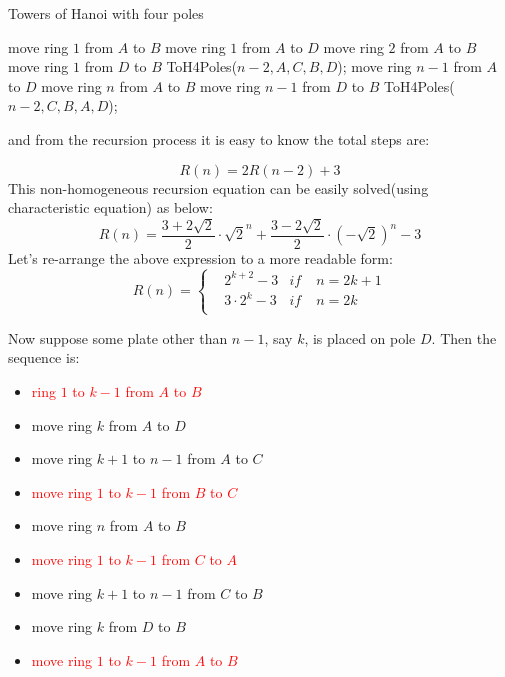 \documentclass[a4paper,11pt]{article}
\theoremstyle{mytheor}
\begin{document}
\begin{algorithm}[H]
\caption{Towers of Hanoi with four poles}\label{fourpoles}
\begin{algorithmic}[1]
    \State move ring $1$ from $A$ to $B$
    \State move ring $1$ from $A$ to $D$
    \State move ring $2$ from $A$ to $B$
    \State move ring $1$ from $D$ to $B$
  \Else
    \State ToH4Poles($n-2, A, C, B, D$);
    \State move ring $n-1$ from $A$ to $D$
    \State move ring $n$ from $A$ to $B$
    \State move ring $n-1$ from $D$ to $B$
    \State ToH4Poles($n-2, C, B, A, D$);
  \EndIf
\EndProcedure
\end{algorithmic}
\end{algorithm}

\noindent and from the recursion process it is easy to know the total steps are:

$$
R(n) = 2R(n-2) + 3
$$
This non-homogeneous recursion equation can be easily solved(using characteristic equation) as below:
$$
R(n) = \frac{3+2\sqrt{2}}{2}\cdot \sqrt{2}^{n}+\frac{3-2\sqrt{2}}{2}\cdot (-\sqrt{2})^{n}-3
$$
Let's re-arrange the above expression to a more readable form:
$$R(n)=\left\{
\begin{aligned}
&2^{k+2}-3 & if\; &n=2k+1 \\
&3\cdot 2^{k} - 3  & if\; &  n =2k \\
\end{aligned}
\right.
$$


\vspace{1 ex}
\noindent Now suppose some plate other than $n-1$, say $k$, is placed on pole $D$. 
Then the sequence is:
\begin{itemize}
    \item \textcolor{red}{ring $1$ to $k-1$ from $A$ to $B$}
    \item move ring $k$ from $A$ to $D$
    \item move ring $k+1$ to $n-1$ from $A$ to $C$
    \item \textcolor{red}{move ring $1$ to $k-1$ from $B$ to $C$}
    \item move ring $n$ from $A$ to $B$
    \item \textcolor{red}{move ring $1$ to $k-1$ from $C$ to $A$}
    \item move ring $k+1$ to $n-1$ from $C$ to $B$
    \item move ring $k$ from $D$ to $B$
    \item \textcolor{red}{move ring $1$ to $k-1$ from $A$ to $B$}
\end{itemize}
\end{document}
